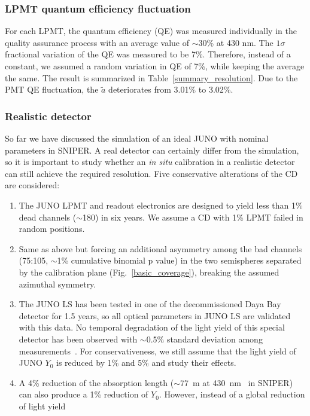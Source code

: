 \documentclass[a4paper,10pt,twoside]{cpc-hepnp}
\begin{document}
\begin{CJK*}{GB}{gbsn}
\begin{multicols}{2}
\subsubsection{LPMT quantum efficiency fluctuation}	
	For each LPMT, the quantum efficiency (QE) was
  measured individually in the quality assurance process with an
  average value of $\sim$30\% at 430 nm. The $1\sigma$ fractional
  variation of the QE was measured to be 7\%. Therefore, instead of a
  constant, we assumed a random variation in QE of 7\%, while keeping
  the average the same. The result is summarized in
  Table~\ref{summary_resolution}.  Due to the PMT QE fluctuation, the
  $\tilde{a}$ deteriorates from 3.01\% to 3.02\%.

\subsubsection{Realistic detector}
\label{sec:real_det}
So far we have discussed the simulation of an ideal JUNO with nominal
parameters in SNIPER. A real detector can certainly differ from the
simulation, so it is important to study whether an {\it in situ}
calibration in a realistic detector can still achieve the required
resolution. Five conservative alterations of the CD are considered:
\begin{enumerate}
\item The JUNO LPMT and readout electronics are designed to yield less
  than 1\% dead channels ($\sim$180) in six years. We assume a CD
  with 1\% LPMT failed in random positions. 
\item Same as above but forcing an additional asymmetry among the bad
  channels (75:105, $\sim$1\% cumulative binomial p value) in the two
  semispheres separated by the calibration plane
  (Fig.~\ref{basic_coverage}), breaking the assumed azimuthal
  symmetry.
\item The JUNO LS has been tested in one of the
    decommissioned Daya Bay detector for 1.5 years, so all optical
    parameters in JUNO LS are validated with this data. No temporal
    degradation of the light yield of this special detector has been
    observed with $\sim$0.5\% standard deviation among
    measurements~\cite{YuZeyuan_LSpaper}. For conservativeness, we
    still assume that the light yield of JUNO $Y_0$ is reduced by 1\%
    and 5\% and study their effects.
\item A 4\% reduction of the absorption length ($\sim$77~m at
  430~nm~\cite{JUNOLSAbsL} in SNIPER) can also produce a 1\% reduction
  of $Y_0$. However, instead of a global reduction of light yield

\end{enumerate}
\end{multicols}
\end{CJK*}
\end{document}

